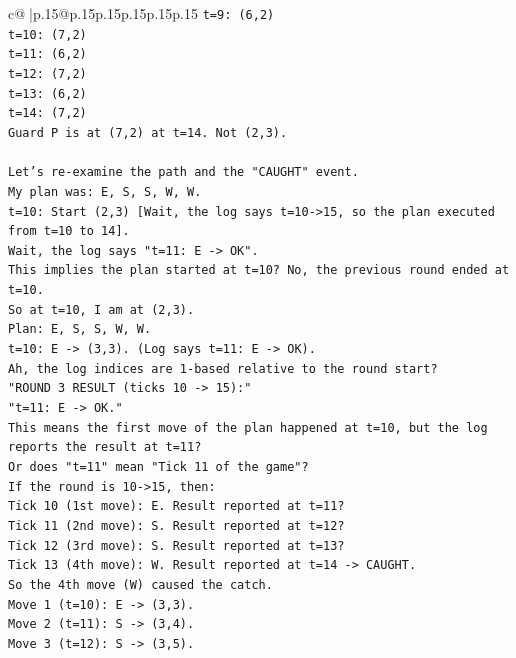 \documentclass{article}
\begin{document}
{\begin{supertabular}{c@{$\;$}|p{.15\linewidth}@{}p{.15\linewidth}p{.15\linewidth}p{.15\linewidth}p{.15\linewidth}p{.15\linewidth}}
{{{\texttt{t=9: (6,2)} \\
\texttt{t=10: (7,2)} \\
\texttt{t=11: (6,2)} \\
\texttt{t=12: (7,2)} \\
\texttt{t=13: (6,2)} \\
\texttt{t=14: (7,2)} \\
\texttt{Guard P is at (7,2) at t=14. Not (2,3).} \\
\\ 
\texttt{Let's re{-}examine the path and the "CAUGHT" event.} \\
\texttt{My plan was: E, S, S, W, W.} \\
\texttt{t=10: Start (2,3) {[}Wait, the log says t=10{-}>15, so the plan executed from t=10 to 14{]}.} \\
\texttt{Wait, the log says "t=11: E {-}> OK".} \\
\texttt{This implies the plan started at t=10? No, the previous round ended at t=10.} \\
\texttt{So at t=10, I am at (2,3).} \\
\texttt{Plan: E, S, S, W, W.} \\
\texttt{t=10: E {-}> (3,3). (Log says t=11: E {-}> OK).} \\
\texttt{Ah, the log indices are 1{-}based relative to the round start?} \\
\texttt{"ROUND 3 RESULT (ticks 10 {-}> 15):"} \\
\texttt{"t=11: E {-}> OK."} \\
\texttt{This means the first move of the plan happened at t=10, but the log reports the result at t=11?} \\
\texttt{Or does "t=11" mean "Tick 11 of the game"?} \\
\texttt{If the round is 10{-}>15, then:} \\
\texttt{Tick 10 (1st move): E. Result reported at t=11?} \\
\texttt{Tick 11 (2nd move): S. Result reported at t=12?} \\
\texttt{Tick 12 (3rd move): S. Result reported at t=13?} \\
\texttt{Tick 13 (4th move): W. Result reported at t=14 {-}> CAUGHT.} \\
\texttt{So the 4th move (W) caused the catch.} \\
\texttt{Move 1 (t=10): E {-}> (3,3).} \\
\texttt{Move 2 (t=11): S {-}> (3,4).} \\
\texttt{Move 3 (t=12): S {-}> (3,5).} \\
}}}
\end{supertabular}}
\end{document}
